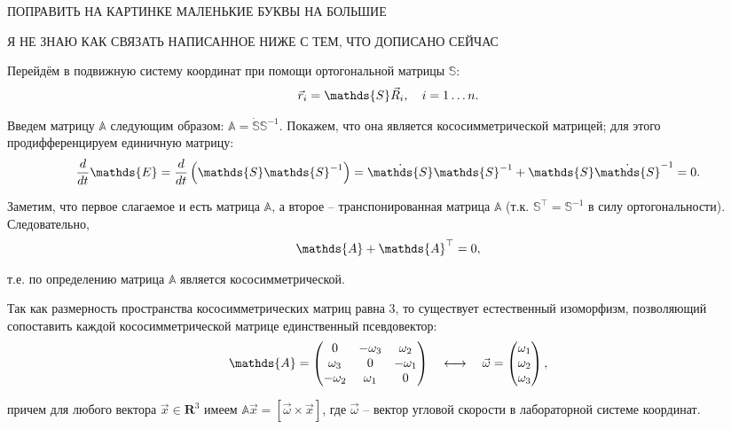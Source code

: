 \documentclass[12pt]{article}
\newcommand{\bbA}{\mathds{A}}
\newcommand{\bbS}{\mathds{S}}
\newcommand{\bbE}{\mathds{E}}
\begin{document}
ПОПРАВИТЬ НА КАРТИНКЕ МАЛЕНЬКИЕ БУКВЫ НА БОЛЬШИЕ

Я НЕ ЗНАЮ КАК СВЯЗАТЬ НАПИСАННОЕ НИЖЕ С ТЕМ, ЧТО ДОПИСАНО СЕЙЧАС

Перейдём в подвижную систему координат при помощи ортогональной матрицы $\bbS$:
\vspace*{-0.1cm}
\begin{gather}
\vec{r}_i = \bbS \vec{R}_i, \quad i = 1 \dots n. \notag
\end{gather}

Введем матрицу $\bbA$ следующим образом: $\bbA = \dot{\bbS} \bbS^{-1}$. Покажем, что она является кососимметрической матрицей; для этого продифференцируем единичную матрицу:
\vspace*{-0.1cm}
\begin{gather}
\frac{d}{dt} \bbE = \frac{d}{dt} \left( \bbS \bbS^{-1}\right) = \dot{\bbS} \bbS^{-1} + \bbS \dot{\bbS}^{-1} = 0. \notag
\end{gather}

Заметим, что первое слагаемое и есть матрица $\bbA$, а второе -- транспонированная матрица $\bbA$ (т.к. $\bbS^\top = \bbS^{-1}$ в силу ортогональности). Следовательно,
\vspace*{-0.1cm}
\begin{gather}
\bbA + \bbA^\top = 0, \notag
\end{gather}

\hspace*{-0.75cm} т.е. по определению матрица $\bbA$ является кососимметрической.

Так как размерность пространства кососимметрических матриц равна 3, то существует естественный изоморфизм, позволяющий сопоставить каждой кососимметрической матрице единственный псевдовектор:
\vspace*{-0.1cm}
\begin{gather}
\bbA = 
\begin{pmatrix}
0 & -\omega_3 & \omega_2 \\
\omega_3 & 0 & -\omega_1 \\
-\omega_2 & \omega_1 & 0
\end{pmatrix}
\quad
\longleftrightarrow
\quad
\vec{\omega} = 
\begin{pmatrix}
\omega_1 \\
\omega_2 \\
\omega_3
\end{pmatrix}
,
\notag
\end{gather}

\hspace*{-0.75cm} причем для любого вектора $\vec{x} \in \mathbf{R}^3$ имеем $\bbA \vec{x} = [ \vec{\omega} \times \vec{x} ]$, где $\vec{\omega}$ -- вектор угловой скорости в лабораторной системе координат.
\end{document}
